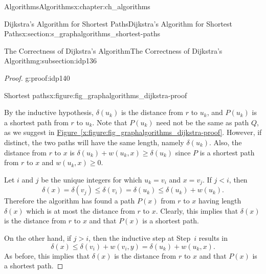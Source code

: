 \documentclass[oneside,10pt,]{book}
\newcommand{\xreffont}{\relax}
\numberwithin{equation}{section}
\newcommand{\lt}{<}
\begin{document}
\begin{chapterptx}{Algorithms}{}{Algorithms}{}{}{x:chapter:ch_algorithms}
\begin{sectionptx}{Dijkstra's Algorithm for Shortest Paths}{}{Dijkstra's Algorithm for Shortest Paths}{}{}{x:section:s_graphalgorithms_shortest-paths}
\begin{subsectionptx}{The Correctness of Dijkstra's Algorithm}{}{The Correctness of Dijkstra's Algorithm}{}{}{g:subsection:idp136}
\begin{proof}{}{g:proof:idp140}
\begin{figureptx}{Shortest paths}{x:figure:fig_graphalgorithms_dijkstra-proof}{}%
\begin{image}{0.125}{0.75}{0.125}%
%
\end{image}%
\tcblower
\end{figureptx}%
By the inductive hypothesis, \(\delta(u_k)\) is the distance from \(r\) to \(u_k\), and \(P(u_k)\) is a shortest path from \(r\) to \(u_k\). Note that \(P(u_k)\) need not be the same as path \(Q\), as we suggest in \hyperref[x:figure:fig_graphalgorithms_dijkstra-proof]{Figure~{\xreffont\ref{x:figure:fig_graphalgorithms_dijkstra-proof}}}. However, if distinct, the two paths will have the same length, namely \(\delta(u_k)\).  Also, the distance from \(r\) to \(x\) is \(\delta(u_k)+w(u_k,x)\ge \delta(u_k)\) since \(P\) is a shortest path from \(r\) to \(x\) and \(w(u_k,x)\geq 0\).%
\par
Let \(i\) and \(j\) be the unique integers for which \(u_k=v_i\) and \(x=v_j\). If \(j \lt i\), then%
\begin{equation*}
\delta(x)= \delta(v_j)\le \delta(v_i)= \delta(u_k)\le
\delta(u_k)+w(u_k).
\end{equation*}
Therefore the algorithm has found a path \(P(x)\) from \(r\) to \(x\) having length \(\delta(x)\) which is at most the distance from \(r\) to \(x\). Clearly, this implies that \(\delta(x)\) is the distance from \(r\) to \(x\) and that \(P(x)\) is a shortest path.%
\par
On the other hand, if \(j>i\), then the inductive step at Step~\(i\) results in%
\begin{equation*}
\delta(x)\le \delta(v_i)+w(v_i,y)=\delta(u_k)+w(u_k,x).
\end{equation*}
As before, this implies that \(\delta(x)\) is the distance from \(r\) to \(x\) and that \(P(x)\) is a shortest path.%
\end{proof}
\end{subsectionptx}
\end{sectionptx}
%
%
\typeout{************************************************}

\end{chapterptx}
\end{document}
